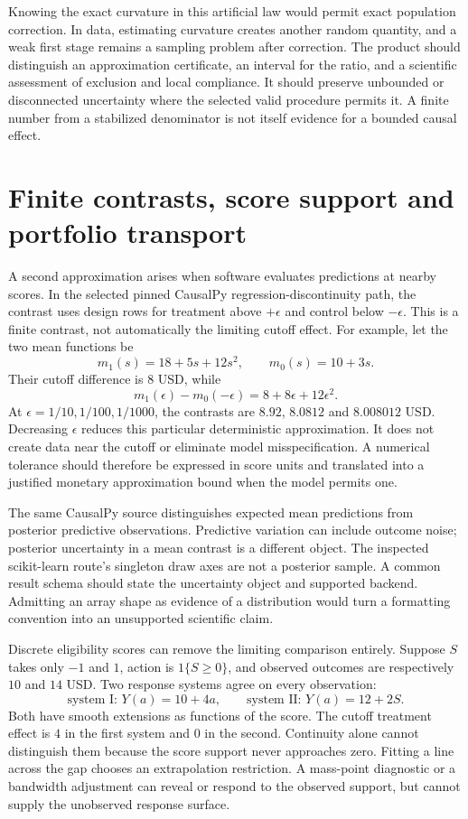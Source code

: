 Knowing the exact curvature in this artificial law would permit exact
population correction. In data, estimating curvature creates another random
quantity, and a weak first stage remains a sampling problem after correction.
The product should distinguish an approximation certificate, an interval for
the ratio, and a scientific assessment of exclusion and local compliance.
It should preserve unbounded or disconnected uncertainty where the selected
valid procedure permits it. A finite number from a stabilized denominator is
not itself evidence for a bounded causal effect.

\section{Finite contrasts, score support and portfolio transport}
\label{exec17:s4-support}

A second approximation arises when software evaluates predictions at nearby
scores. In the selected pinned CausalPy regression-discontinuity path, the
contrast uses design rows for treatment above $+\epsilon$ and control below
$-\epsilon$. This is a finite contrast, not automatically the limiting
cutoff effect. For example, let the two mean functions be
\[
 m_1(s)=18+5s+12s^2,\qquad m_0(s)=10+3s.
\]
Their cutoff difference is $8$ USD, while
\[
 m_1(\epsilon)-m_0(-\epsilon)=8+8\epsilon+12\epsilon^2.
\]
At $\epsilon=1/10,1/100,1/1000$, the contrasts are $8.92$, $8.0812$ and
$8.008012$ USD. Decreasing $\epsilon$ reduces this particular deterministic
approximation. It does not create data near the cutoff or eliminate model
misspecification. A numerical tolerance should therefore be expressed in
score units and translated into a justified monetary approximation bound
when the model permits one.\citep{exec14_causalpy_primary,exec17_s4_math}

The same CausalPy source distinguishes expected mean predictions from
posterior predictive observations. Predictive variation can include outcome
noise; posterior uncertainty in a mean contrast is a different object.
The inspected scikit-learn route's singleton draw axes are not a posterior
sample. A common result schema should state the uncertainty object and
supported backend. Admitting an array shape as evidence of a distribution
would turn a formatting convention into an unsupported scientific claim.
\citep{exec14_causalpy_primary,exec17_s4_paths}

Discrete eligibility scores can remove the limiting comparison entirely.
Suppose $S$ takes only $-1$ and $1$, action is $1\{S\geq0\}$, and observed
outcomes are respectively $10$ and $14$ USD. Two response systems agree on
every observation:
\[
 \text{system I: }Y(a)=10+4a,\qquad
 \text{system II: }Y(a)=12+2S.
\]
Both have smooth extensions as functions of the score. The cutoff treatment
effect is $4$ in the first system and $0$ in the second. Continuity alone
cannot distinguish them because the score support never approaches zero.
Fitting a line across the gap chooses an extrapolation restriction. A
mass-point diagnostic or a bandwidth adjustment can reveal or respond to
the observed support, but cannot supply the unobserved response surface.
\citep{exec17_s4_math}


